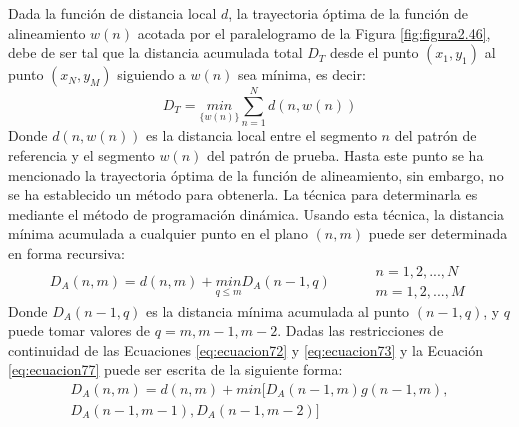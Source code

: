 \begin{enumerate}
\vskip -0.5cm
Dada la función de distancia local $d$, la trayectoria óptima de la función de alineamiento $w(n)$ acotada por el paralelogramo de la Figura \ref{fig:figura2.46}, debe de ser tal que la distancia acumulada total $D_{T}$ desde el punto $(x_{1}, y_{1})$ al punto $(x_{N}, y_{M})$ siguiendo a $w(n)$ sea mínima, es decir: 
\begin{equation}
\label{eq:ecuacion76}
D_{T} = \underset{\{w(n)\}}{min} \sum_{n=1}^{N}d(n,w(n))
\end{equation}
Donde $d(n,w(n))$ es la distancia local entre el segmento $n$ del patrón de referencia y el segmento $w(n)$ del patrón de prueba.
\vskip 0.5cm
Hasta este punto se ha mencionado la trayectoria óptima de la función de alineamiento, sin embargo, no se ha establecido un método para obtenerla. La técnica para determinarla es mediante el método de programación dinámica. Usando esta técnica, la distancia mínima acumulada a cualquier punto en el plano $(n,m)$ puede ser determinada en forma recursiva:
\begin{equation}
\label{eq:ecuacion77}
D_{A}(n,m) = d(n,m) + \underset{q \leq m}{min} D_{A}(n-1,q)
\qquad
\begin{aligned}
& n = 1,2,...,N \\
& m = 1,2,...,M
\end{aligned}
\end{equation}
\vskip 0.5cm
Donde $D_{A}(n-1, q)$ es la distancia mínima acumulada al punto $(n-1, q)$, y $q$ puede tomar valores de $q = m, m - 1, m - 2$. Dadas las restricciones de continuidad de las Ecuaciones \eqref{eq:ecuacion72} y \eqref{eq:ecuacion73} y la Ecuación \eqref{eq:ecuacion77} puede ser escrita de la siguiente forma:
\begin{equation}
\label{eq:ecuacion78}
\begin{aligned}
D_{A}(n,m) = d(n,m) + min[D_{A}(n-1,m)g(n-1,m) , \\
D_{A}(n-1,m-1),D_{A}(n-1,m-2)]
\end{aligned}
\end{equation}


\end{enumerate}
